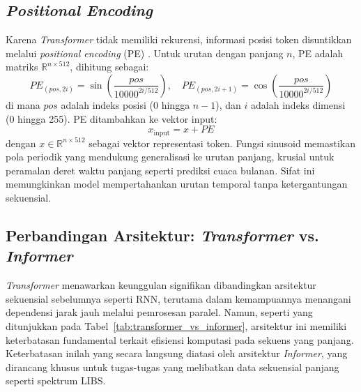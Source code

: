 \subsection{\textit{Positional Encoding}}

Karena \textit{Transformer} tidak memiliki rekurensi, informasi posisi token disuntikkan melalui \textit{positional encoding} (PE) \citep{Vaswani2017}. Untuk urutan dengan panjang \( n \), PE adalah matriks \( \mathbb{R}^{n \times 512} \), dihitung sebagai:
\begin{equation}
PE_{(pos, 2i)} = \sin\left(\frac{pos}{10000^{2i/512}}\right), \quad PE_{(pos, 2i+1)} = \cos\left(\frac{pos}{10000^{2i/512}}\right) \label{eq:bab2_eq40}
\end{equation}
di mana \( pos \) adalah indeks posisi (0 hingga \( n-1 \)), dan \( i \) adalah indeks dimensi (0 hingga 255). PE ditambahkan ke vektor input:
\begin{equation}
x_{\text{input}} = x + PE \label{eq:bab2_eq41}
\end{equation}
dengan \( x \in \mathbb{R}^{n \times 512} \) sebagai vektor representasi token. Fungsi sinusoid memastikan pola periodik yang mendukung generalisasi ke urutan panjang, krusial untuk peramalan deret waktu panjang seperti prediksi cuaca bulanan. Sifat ini memungkinkan model mempertahankan urutan temporal tanpa ketergantungan sekuensial.

\subsection{Perbandingan Arsitektur: \textit{Transformer} vs. \textit{Informer}}

\textit{Transformer} menawarkan keunggulan signifikan dibandingkan arsitektur sekuensial sebelumnya seperti RNN, terutama dalam kemampuannya menangani dependensi jarak jauh melalui pemrosesan paralel. Namun, seperti yang ditunjukkan pada Tabel~\ref{tab:transformer_vs_informer}, arsitektur ini memiliki keterbatasan fundamental terkait efisiensi komputasi pada sekuens yang panjang. Keterbatasan inilah yang secara langsung diatasi oleh arsitektur \textit{Informer}, yang dirancang khusus untuk tugas-tugas yang melibatkan data sekuensial panjang seperti spektrum LIBS.

